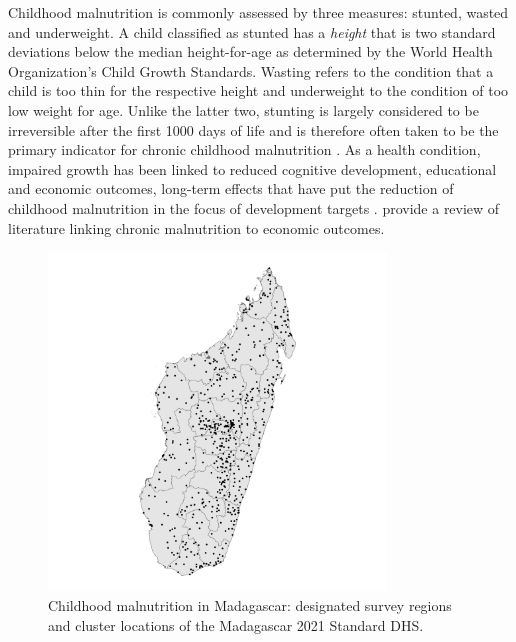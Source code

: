Childhood malnutrition is commonly assessed by three measures: stunted, wasted and underweight. A child classified as stunted has a \textit{height} that is two standard deviations below the median height-for-age as determined by the World Health Organization's Child Growth Standards. Wasting refers to the condition that a child is too thin for the respective height and underweight to the condition of too low weight for age. Unlike the latter two, stunting is largely considered to be irreversible after the first 1000 days of life and is therefore often taken to be the primary indicator for chronic childhood malnutrition \autocite{deweyLongtermConsequencesStunting2011, victoraRevisitingMaternalChild2021}. As a health condition, impaired growth has been linked to reduced cognitive development, educational and economic outcomes, long-term effects that have put the reduction of childhood malnutrition in the focus of development targets \autocite{deweyLongtermConsequencesStunting2011}. \textcite{mcgovernReviewEvidenceLinking2017} provide a review of literature linking chronic malnutrition to economic outcomes.

\begin{figure}[!t]
	\centering
	\includegraphics[width=0.8\textwidth, keepaspectratio]{figures/madagascar_clusterlocations.png}
	\caption{Childhood malnutrition in Madagascar: designated survey regions and cluster locations of the Madagascar 2021 Standard DHS.}
	\label{fig:madagascar_clusterloc}
\end{figure}

